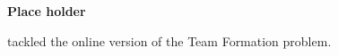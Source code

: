 \textbf{Place holder}

\cite{anagnostopoulos2012online} tackled the online version of the Team Formation problem.
